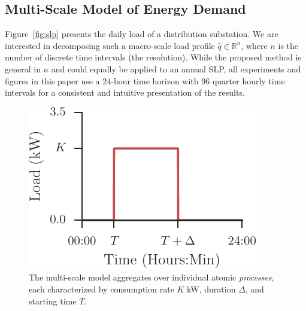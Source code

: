 \documentclass[conference]{IEEEtran}
\begin{document}
\subsection{Multi-Scale Model of Energy Demand}\label{sec:LoadProfilesDecomposition}

Figure~\ref{fig:slp} presents the daily load of a distribution substation. We are interested in decomposing such a macro-scale load profile $\hat{q} \in \mathbb{R}^n$, where $n$ is the number of discrete time intervals (the resolution). While the proposed method is general in $n$ and could equally be applied to an annual SLP, all experiments and figures in this paper use a $24$-hour time horizon with 96 quarter hourly time intervals for a consistent and intuitive presentation of the results.

\begin{figure}[!b]
\centering
\includegraphics[width=0.6\columnwidth]{figures/process.pdf}
\caption{The multi-scale model aggregates over individual atomic \emph{processes}, each characterized by consumption rate $K$ kW, duration $\Delta$, and starting time $T$.}
\label{fig:process}
\end{figure}
\end{document}
